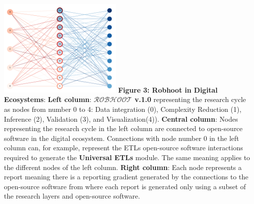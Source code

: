 \documentclass[10pt, a4paper, twocolumn]{article} %
\begin{document}
  \includegraphics[width=0.45\textwidth]{FigureRobhoot.pdf}
  {\small {\bf Figure 3: Robhoot in Digital Ecosystems}: {\bf Left
      column}: {\bf $\mathcal{ROBHOOT}$ v.1.0} representing the
    research cycle as nodes from number 0 to 4: Data integration (0),
    Complexity Reduction (1), Inference (2), Validation (3), and
    Visualization(4)). {\bf Central column}: Nodes representing the
    research cycle in the left column are connected to open-source
    software in the digital ecosystem. Connections with node number 0
    in the left column can, for example, represent the ETLs
    open-source software interactions required to generate the {\bf
      Universal ETLs} module. The same meaning applies to the
    different nodes of the left column. {\bf Right column}: Each node
    represents a report meaning there is a reporting gradient
    generated by the connections to the open-source software from
    where each report is generated only using a subset of the research
    layers and open-source software.}



\end{document}

